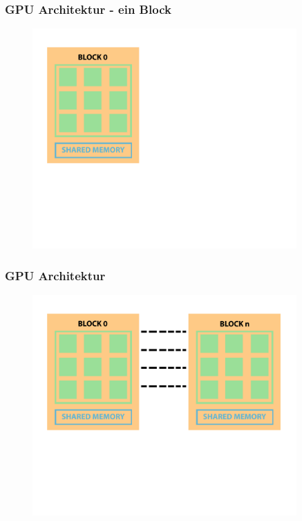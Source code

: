 \documentclass{sikslides}
\begin{document}
\begin{frame}
	\frametitle{GPU Architektur - ein Block}
\begin{figure}[htbp] 
  \centering
  \includegraphics[width=0.9\textwidth]{figures/gpumemory3.png}
  \label{Fig:gpum}
\end{figure}
\end{frame}





\begin{frame}
	\frametitle{GPU Architektur}
\begin{figure}[htbp] 
  \centering
  \includegraphics[width=0.9\textwidth]{figures/gpumemory4.png}
  \label{Fig:gpum}
\end{figure}

\end{frame}
\end{document}
